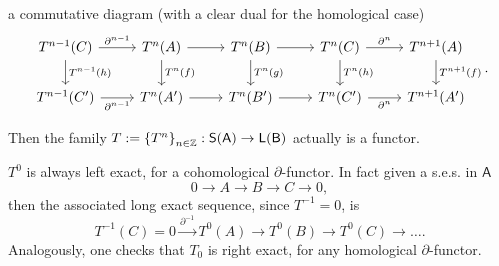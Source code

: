 \begin{defn}
\begin{enumerate}
			a commutative diagram (with a clear dual for the homological case)
			\begin{equation}
			\begin{tikzcd}
				T^{n-1}(C) \arrow[r, "\partial^{n-1}", rightarrow] \arrow[d, "T^{n-1}(h)", rightarrow] &
				T^n(A) \arrow[r, "", rightarrow] \arrow[d, "T^n(f)", rightarrow] &
				T^n(B) \arrow[r, "", rightarrow] \arrow[d, "T^n(g)", rightarrow] &
				T^n(C) \arrow[r, "\partial^n", rightarrow] \arrow[d, "T^n(h)", rightarrow] &
				T^{n+1}(A) \arrow[d, "T^{n+1}(f)", rightarrow] \\
				T^{n-1}(C') \arrow[r, "\partial^{n-1}"', rightarrow] &
				T^n(A') \arrow[r, "", rightarrow] &
				T^n(B') \arrow[r, "", rightarrow] &
				T^n(C') \arrow[r, "\partial^n"', rightarrow] &
				T^{n+1}(A')
			\end{tikzcd}
			.\end{equation} 
	\end{enumerate}
	Then the family $T := \left\{ T^n \right\}_{n \in \mathbb{Z}}: \mathsf{S}(\mathsf{A}) \to \mathsf{L}(\mathsf{B})$
	actually is a functor.
\end{defn}

\begin{rem}[]
	$T^0$ is always left exact, for a cohomological $\partial$-functor.
	In fact given a s.e.s. in $\mathsf{A}$
	\begin{equation}
		0 \to A \to B \to C \to 0
	,\end{equation} 
	then the associated long exact sequence, since $T^{-1} = 0$, is
	\begin{equation}
		T^{-1}(C) = 0 \xrightarrow{\partial^{-1}} T^0(A) \to T^0(B) \to T^0(C) \to \ldots
	.\end{equation} 
	Analogously, one checks that $T_0$ is right exact, for any
	homological $\partial$-functor.
\end{rem}

